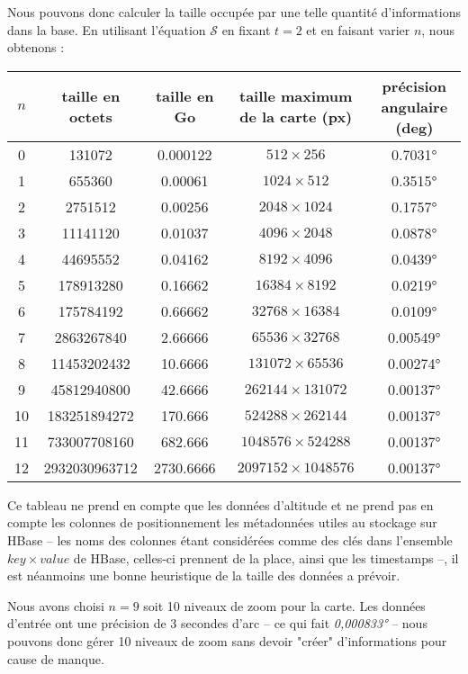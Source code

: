 \documentclass[a4paper]{article}
\begin{document}
	Nous pouvons donc calculer la taille occupée par une telle quantité d'informations dans la base. En utilisant l'équation $\mathcal{S}$ en fixant $t = 2$ et en faisant varier $n$, nous obtenons :

\noindent
\begin{tabular}{|c|c|c|c|c|}
\hline
$n$ & taille en octets & taille en Go & taille maximum de la carte (px) & précision angulaire (deg)\\\hline
0 & 131072 & 0.000122 & $512 \times 256$ & 0.7031°\\\hline
1 & 655360 & 0.00061 & $1024 \times 512$ & 0.3515°\\\hline
2 & 2751512 & 0.00256 & $2048 \times 1024$ & 0.1757°\\\hline
3 & 11141120 & 0.01037 & $4096 \times 2048$ & 0.0878°\\\hline
4 & 44695552 & 0.04162 & $8192 \times 4096$ & 0.0439°\\\hline
5 & 178913280 & 0.16662 & $16384 \times 8192$ & 0.0219°\\\hline
6 & 175784192 & 0.66662 & $32768 \times 16384$ & 0.0109°\\\hline
7 & 2863267840 & 2.66666 & $65536 \times 32768$ & 0.00549°\\\hline
8 & 11453202432 & 10.6666 & $131072 \times 65536$ & 0.00274°\\\hline
9 & 45812940800 & 42.6666 & $262144 \times 131072$ & 0.00137°\\\hline
10 & 183251894272 & 170.666 & $524288 \times 262144$ & 0.00137°\\\hline
11 & 733007708160 & 682.666 & $1048576 \times 524288$ & 0.00137°\\\hline
12 & 2932030963712 & 2730.6666 & $2097152 \times 1048576$ & 0.00137°\\\hline
\end{tabular}

	Ce tableau ne prend en compte que les données d'altitude et ne prend pas en compte les colonnes de positionnement les métadonnées utiles au stockage sur HBase -- les noms des colonnes étant considérées comme des clés dans l'ensemble $key \times value$ de HBase, celles-ci prennent de la place, ainsi que les timestamps --, il est néanmoins une bonne heuristique de la taille des données a prévoir.
    
Nous avons choisi $n = 9$ soit 10 niveaux de zoom pour la carte. Les données d'entrée ont une précision de 3 secondes d'arc -- ce qui fait \emph{0,000833°} -- nous pouvons donc gérer 10 niveaux de zoom sans devoir "créer" d'informations pour cause de manque.
\end{document}
